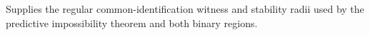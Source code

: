 Supplies the regular common-identification witness and stability radii used by the predictive impossibility theorem and both binary regions.